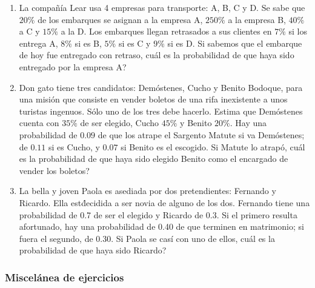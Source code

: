 \begin{Ejer}
\begin{enumerate}
\item La compa\~n\'ia Lear usa 4 empresas para transporte: A, B, C y D. Se sabe que $20\%$ de los embarques se asignan a la empresa A, $250\%$ a la empresa B, $40\%$ a C y $15\%$ a la D. Los embarques llegan retrasados a sus clientes en $7\%$ si los entrega A, $8\%$ si es B, $5\%$ si es C y $9\%$ si es D. Si sabemos que el embarque de hoy fue entregado con retraso,  cu\'al es la probabilidad de que haya sido entregado por la empresa A?

\item Don gato tiene tres candidatos: Dem\'ostenes, Cucho y Benito Bodoque, para una misi\'on que consiste en vender boletos de una rifa inexistente a unos turistas ingenuos. S\'olo uno de los tres debe hacerlo. Estima que Dem\'ostenes cuenta con $35\%$ de ser elegido, Cucho $45\%$ y Benito $20\%$. Hay una probabilidad de $0.09$ de que los atrape el Sargento Matute si va Dem\'ostenes; de $0.11$ si es Cucho, y $0.07$ si Benito es el escogido. Si Matute lo atrap\'o, cu\'al es la probabilidad de que haya sido elegido Benito como el encargado de vender los boletos?

\item La bella y joven Paola es asediada por dos pretendientes: Fernando y Ricardo. Ella est\' decidida a ser novia de alguno de los dos. Fernando tiene una probabilidad de 0.7 de ser el elegido y Ricardo de 0.3. Si el primero resulta afortunado, hay una probabilidad de 0.40 de que terminen en matrimonio; si fuera el segundo, de 0.30. Si Paola se cas\'i con uno de ellos,  cu\'al es la probabilidad de que haya sido Ricardo?
\end{enumerate}
\end{Ejer}



\subsubsection*{Miscel\'anea de ejercicios}


